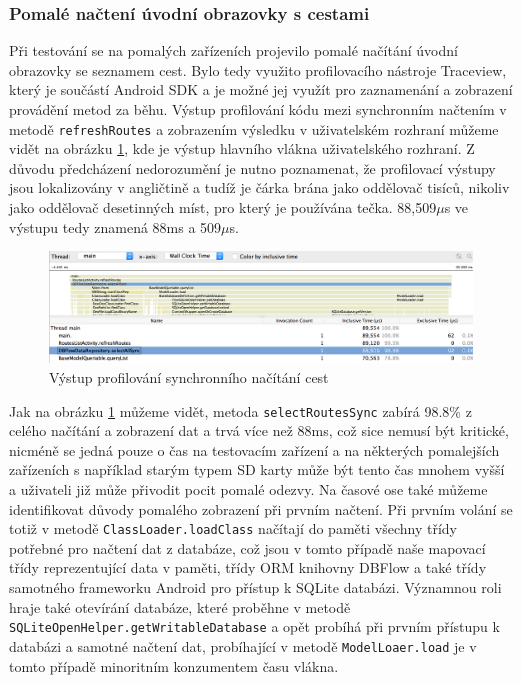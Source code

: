 \documentclass[czech,master,public,dept460,male,java,cpdeclaration]{diploma}
\begin{document}
\subsubsection{Pomalé načtení úvodní obrazovky s cestami}
 Při testování se na pomalých zařízeních projevilo pomalé načítání úvodní obrazovky se
 seznamem cest. Bylo tedy využito profilovacího nástroje Traceview, který je součástí Android SDK
  a je možné jej využít pro zaznamenání a zobrazení provádění metod za běhu. Výstup profilování kódu
  mezi synchronním načtením v metodě \texttt{refreshRoutes} a zobrazením výsledku v uživatelském rozhraní
  můžeme vidět na obrázku \ref{fig:syncroutes}, kde je výstup hlavního vlákna uživatelského rozhraní.
  Z důvodu předcházení nedorozumění je nutno poznamenat, že profilovací výstupy jsou lokalizovány
  v angličtině a tudíž je čárka brána jako oddělovač tisíců, nikoliv jako oddělovač desetinných míst,
  pro který je používána tečka. 88,509$\mu$s ve výstupu tedy znamená 88ms a 509$\mu$s.

  \begin{figure}[H]
          \centering
                  \includegraphics[scale=0.38]{img/SyncRoutesMainThread.png}
          \caption{Výstup profilování synchronního načítání cest}
          \label{fig:syncroutes}
  \end{figure}

  Jak na obrázku \ref{fig:syncroutes} můžeme vidět, metoda \texttt{selectRoutesSync} zabírá 98.8\%
  z celého načítání a zobrazení dat a trvá více než 88ms, což sice nemusí být kritické,
  nicméně se jedná pouze o čas na testovacím zařízení a na některých pomalejších zařízeních
  s například starým typem SD karty může být tento čas mnohem vyšší a uživateli
  již může přivodit pocit pomalé odezvy. Na časové ose také můžeme identifikovat důvody pomalého
  zobrazení při prvním načtení. Při prvním volání se totiž v metodě \texttt{ClassLoader.loadClass}
  načítají do paměti všechny třídy potřebné pro načtení dat z databáze,
  což jsou v tomto případě naše mapovací třídy reprezentující data v paměti, třídy ORM knihovny
  DBFlow a také třídy samotného frameworku Android pro přístup k SQLite databázi. Významnou
  roli hraje také otevírání databáze, které proběhne v metodě \texttt{SQLiteOpenHelper.getWritableDatabase}
  a opět probíhá při prvním přístupu k databázi a samotné načtení dat, probíhající v metodě
 \texttt{ModelLoaer.load} je v tomto případě minoritním konzumentem času vlákna.
\end{document}
